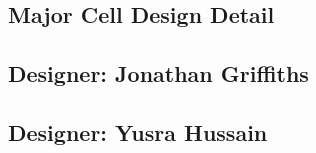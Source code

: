 \documentclass[11pt,a4paper]{article} %
\begin{document}
\begin{appendices}
 \newpage
\section{Major Cell Design Detail}
\newpage
\subsection{Designer: Jonathan Griffiths\\} %

%
\newpage

\subsection{Designer: Yusra Hussain\\} %

%

\end{appendices}

\newpage

%
%



\end{document}
